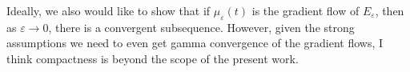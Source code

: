 \documentclass[11pt,leqno]{amsart}
\newtheorem{lem}[thm]{LEMMA}
\theoremstyle{definition}
\newcommand{\be}{\begin{equation}}
\newcommand{\ee}{\end{equation}}
\newcommand{\bes}{\begin{equation*}}
\newcommand{\ees}{\end{equation*}}
\newcommand{\comment}[1]{{\color{red}#1}} %
\newcommand{\R}{{\mathord{\mathbb R}}}
\newcommand{\grad}{\nabla}
\newcommand{\wto}{\rightharpoonup}
\def\P{{\mathcal P}}
\def\e{\varepsilon}
\newcommand{\ird}{\int_{\mathord{\mathbb R}^d}}
\begin{document}
{\color{Aquamarine} Ideally, we also would like to show that if $\mu_\e(t)$ is the gradient flow of $E_\e$, then as $\e \to 0$, there is a convergent subsequence. However, given the strong assumptions we need to even get gamma convergence of the gradient flows, I think compactness is beyond the scope of the present work.}
%
\end{document}

